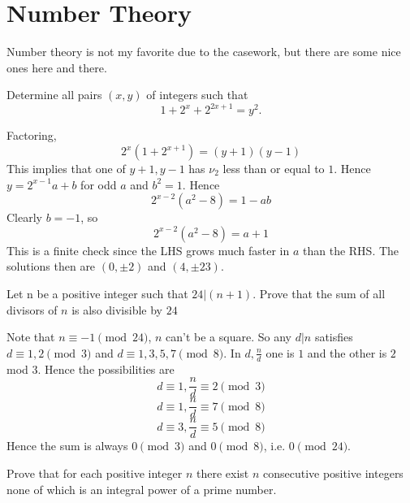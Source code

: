 \documentclass[11pt]{scrartcl}
\begin{document}
\section{Number Theory}
Number theory is not my favorite due to the casework, but there are some nice ones here and there.
\begin{example}
  [IMO 2006]
  Determine all pairs $(x, y)$ of integers such that\[1+2^{x}+2^{2x+1}= y^{2}.\]
\end{example}
\begin{soln}
  Factoring,
  $$2^x(1+2^{x+1})=(y+1)(y-1)$$
  This implies that one of $y+1, y-1$ has $\nu_2$ less than or equal to $1$.
  Hence $y=2^{x-1}a+b$ for odd $a$ and $b^2=1$. Hence
  $$2^{x-2}(a^2-8)=1-ab$$
  Clearly $b=-1$, so
  $$2^{x-2}(a^2-8)=a+1$$
  This is a finite check since the LHS grows much faster in $a$ than the RHS.
  The solutions then are $(0,\pm 2)$ and $(4,\pm 23)$.
\end{soln}
\begin{example}
  [Putnam 1969]
  Let n be a positive integer such that $24|(n+1)$. Prove that the sum
  of all divisors of $n$ is also divisible by $24$
\end{example}
\begin{soln}
  Note that $n\equiv -1\pmod{24}$, $n$ can't be a square. So any $d|n$ satisfies $d\equiv 1,2\pmod{3}$
  and $d\equiv 1,3,5,7\pmod{8}$. In $d, \frac{n}{d}$ one is $1$ and the other is $2$ mod 3.
  Hence the possibilities are
  $$d\equiv 1, \frac{n}{d}\equiv 2\pmod{3}$$
  $$d\equiv 1, \frac{n}{d}\equiv 7\pmod{8}$$
  $$d\equiv 3, \frac{n}{d}\equiv 5\pmod{8}$$
  Hence the sum is always $0\pmod{3}$ and $0\pmod{8}$, i.e. $0\pmod{24}$.
\end{soln}
\begin{example}
  [IMO 1989]
  Prove that for each positive integer $ n$ there exist $ n$ consecutive positive integers none of which is an integral power of a prime number.
\end{example}
\end{document}

